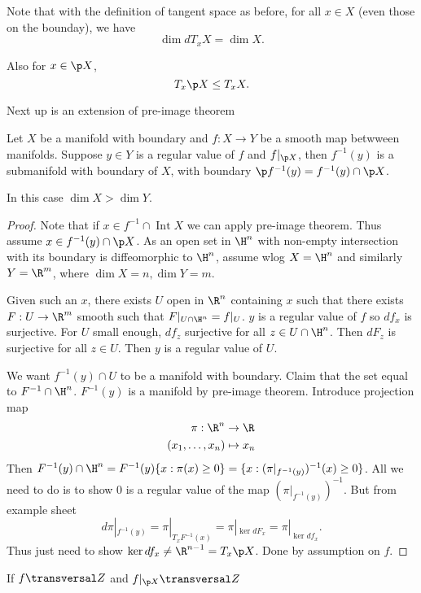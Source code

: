 \documentclass[a4paper]{article}
\DeclareMathOperator{\Int}{Int}
\begin{document}
Note that with the definition of tangent space as before, for all \(x \in X\) (even those on the bounday), we have
\[
  \dim dT_xX = \dim X.
\]

Also for \(x \in \p X\),
\[
  T_x\p X \leq T_xX.
\]

Next up is an extension of pre-image theorem

\begin{theorem}
  Let \(X\) be a manifold with boundary and \(f: X \to Y\) be a smooth map betwween manifolds. Suppose \(y \in Y\) is a regular value of \(f\) and \(f|_{\p X}\), then \(f^{-1}(y)\) is a submanifold with boundary of \(X\), with boundary \(\p f^{-1}(y) = f^{-1}(y) \cap \p X\).
\end{theorem}
In this case \(\dim X > \dim Y\).

\begin{proof}
  Note that if \(x \in f^{-1} \cap \Int X\) we can apply pre-image theorem. Thus assume \(x \in f^{-1}(y) \cap \p X\). As an open set in \(\H^n\) with non-empty intersection with its boundary is diffeomorphic to \(\H^n\), assume wlog \(X = \H^n\) and similarly \(Y = \R^m\), where \(\dim X = n, \dim Y = m\).

  Given such an \(x\), there exists \(U\) open in \(\R^n\) containing \(x\) such that there exists \(F: U \to \R^m\) smooth such that \(F|_{U \cap \H^n} = f|_U\). \(y\) is a regular value of \(f\) so \(df_x\) is surjective. For \(U\) small enough, \(df_z\) surjective for all \(z \in U \cap \H^n\). Then \(dF_z\) is surjective for all \(z \in U\). Then \(y\) is a regular value of \(U\).

  We want \(f^{-1}(y) \cap U\) to be a manifold with boundary. Claim that the set equal to \(F^{-1} \cap \H^n\). \(F^{-1}(y)\) is a manifold by pre-image theorem. Introduce projection map
  \begin{align*}
    \pi: \R^n &\to \R \\
    (x_1, \dots, x_n) &\mapsto x_n
  \end{align*}
  Then \(F^{-1}(y) \cap \H^n = F^{-1}(y) \{x: \pi(x) \geq 0\} = \{x: (\pi|_{f^{-1}(y)})^{-1}(x) \geq 0\}\). All we need to do is to show \(0\) is a regular value of the map \((\pi|_{f^{-1}(y)})^{-1}\). But from example sheet
  \[
    d\pi|_{f^{-1}(y)} = \pi|_{T_xF^{-1}(x)} = \pi|_{\ker dF_x} = \pi|_{\ker df_x}.
  \]
  Thus just need to show \(\ker df_x \neq \R^{n - 1} = T_x\p X\). Done by assumption on \(f\).
\end{proof}

If \(f \transversal Z\) and \(f|_{\p X} \transversal Z\)
\blindtext
\end{document}
